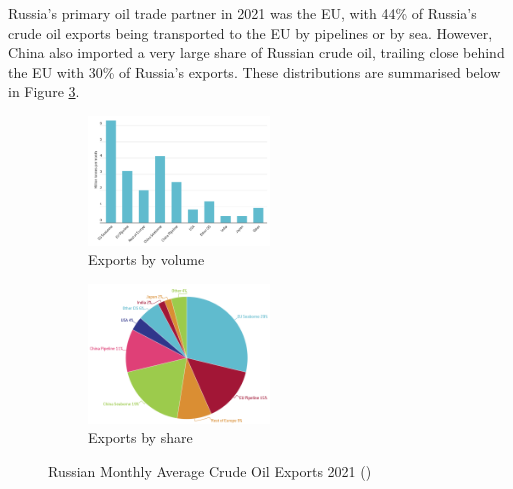 \documentclass[12pt]{article}
\begin{document}
Russia's primary oil trade partner in 2021 was the EU, with 44\% of Russia's crude oil exports being transported to the EU by pipelines or by sea. However, China also imported a very large share of Russian crude oil, trailing close behind the EU with 30\% of Russia's exports. These distributions are summarised below in Figure \ref{fig:21 trade part}. 

\begin{figure}[h]
     \centering
     \begin{subfigure}[b]{0.45\textwidth}
         \centering
         \includegraphics[width=0.53\textwidth]{images/21 trade part chart.png}
         \caption{Exports by volume}
         \label{fig:21 trade part chart}
     \end{subfigure}
     \hfill
     \begin{subfigure}[b]{0.45\textwidth}
         \centering
         \includegraphics[width=0.53\textwidth]{images/21 trade part pie.png}
         \caption{Exports by share}
         \label{fig:21 trade part pie}
     \end{subfigure}
     \hfill
        \caption{Russian Monthly Average Crude Oil Exports 2021 (\citeauthor{heussaff_guetta-jeanrenaud_mcwilliams_zachmann_2023})}
        \label{fig:21 trade part}
\end{figure}
\end{document}
